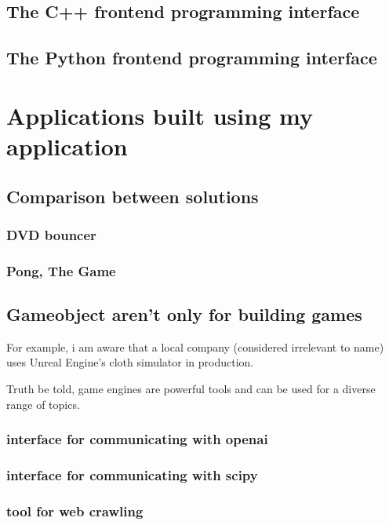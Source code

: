     \section{The C++    frontend programming interface}
    \section{The Python frontend programming interface}


\chapter{Applications built using my application}
    
    \section{Comparison between solutions}

        \subsection{DVD bouncer}

        \subsection{Pong, The Game}


    \section{Gameobject aren't only for building games}
        
        For example, i am aware that a local company (considered irrelevant to name) uses Unreal Engine's cloth simulator in production. 

        Truth be told, game engines are powerful tools and can be used for a diverse range of topics.


        \subsection{interface for communicating with openai}
        \subsection{interface for communicating with scipy}
        \subsection{tool for web crawling}
    



